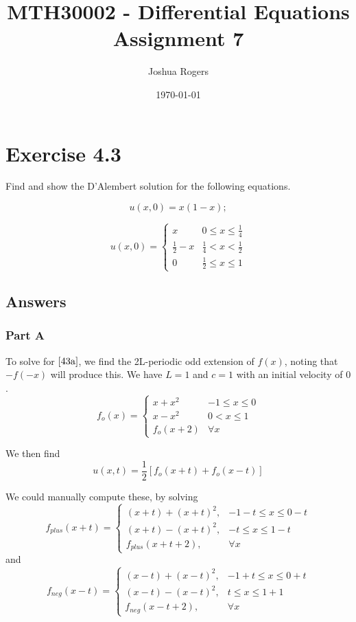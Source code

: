 \documentclass{article}
\title{\vspace{-4cm}MTH30002 - Differential Equations Assignment 7}
\author{Joshua Rogers}
\date\today
\begin{document}
\maketitle

\section*{Exercise 4.3}

Find and show the D'Alembert solution for the following equations.

\begin{equation}\label{43a}
u(x,0) = x(1-x);
\end{equation}

\begin{equation}\label{43b}
u(x,0) = \begin{cases}
x & 0 \leq x \leq \frac{1}{4} \\
\frac{1}{2} - x & \frac{1}{4} < x < \frac{1}{2} \\
0 & \frac{1}{2} \leq x \leq 1
   \end{cases}
\end{equation}

\subsection*{Answers}
\subsubsection*{Part A}

To solve for $\eqref{43a}$, we find the 2L-periodic odd extension of $f(x)$, noting that $-f(-x)$ will produce this. We have $L=1$ and $c=1$ with an initial velocity of $0$.
$$
f_o (x) = \begin{cases}
x+x^2 & -1 \leq x \leq 0 \\
x-x^2  & 0 < x \leq 1 \\
f_o (x+2) & \forall x
   \end{cases}
$$


We then find
$$
u(x,t) = \frac{1}{2} \left[ f_o(x+t)+f_o(x-t)\right]
$$

We could manually compute these, by solving
$$
f_{plus}(x+t) =
\begin{cases}
(x+t)+(x+t)^2, & -1-t \leq x \leq 0-t \\
(x+t)-(x+t)^2, & -t \leq x \leq 1-t \\
f_{plus}(x+t+2), & \forall x
   \end{cases}
$$
and
$$
f_{neg}(x-t) =
\begin{cases}
(x-t)+(x-t)^2, & -1 +t \leq x \leq 0+t \\
(x-t)-(x-t)^2, & t \leq x \leq 1+1 \\
f_{neg}(x-t+2), & \forall x
   \end{cases}
$$
\end{document}
